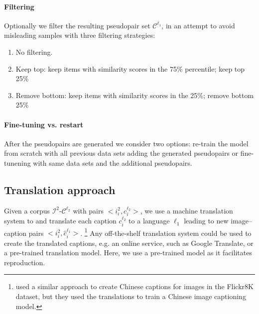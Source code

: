\begin{comment}

\paragraph{2. Image-similarities} are the second option we explored. 
This approach is the same as the sentence similarities just the other way 
around as in as shown in Algorithm~\ref{alg:imgsim}.
\begin{algorithm}
\begin{algorithmic}
\State $pseudo\_imgs \Leftarrow [\;]$
\For{$i_2 \in D_2$} 
    \State $\hat{i_1}$ = arg max $sim(i_2, I_1)$
    \State $pseudo\_imgs$.add($\hat{i_1}$)
\EndFor
\end{algorithmic}
\caption{Pseudo-pairs based on image-similarities.}
\label{alg:imgsim}
\end{algorithm}
\end{comment}

\paragraph{Filtering}

Optionally we filter 
the resulting pseudopair set $\mathcal{C}^{\ell_1}$, in an attempt to
avoid misleading samples with three filtering strategies:

\begin{enumerate}
    \item No filtering.
    \item Keep top: keep items with similarity scores in the 75\% percentile; keep top 25\% 
    \item Remove bottom: keep items with similarity scores in the 25\%; remove bottom 25\%
\end{enumerate}

\paragraph{Fine-tuning vs. restart}
After the pseudopairs are generated we consider two 
options: re-train the model from scratch with all previous 
data sets adding the generated pseudopairs or fine-tunening with
same data sets and the additional pseudopairs.


\subsection{Translation approach}\label{sec:method:mt}
Given a corpus  
$\mathcal{I}^2$-$\mathcal{C}^{\ell_2}$ with pairs 
$<i^2_i, c^{\ell_2}_i>$, we use a machine 
translation system 
to and translate each caption $c^{\ell_2}_i$ to a language $\ell_1$ leading to new image--caption pairs 
$<i^2_i, \hat{c}^{\ell_1}_i>$.
\footnote{\citet{li2016adding} used a similar approach to create Chinese captions for images in the Flickr8K dataset, but they used the translations to train a Chinese image captioning model.} 
Any off-the-shelf translation system could be used to create the translated captions, e.g. an online service, such as Google Translate, or a pre-trained translation model. Here, we use a pre-trained model as it facilitates reproduction. 

